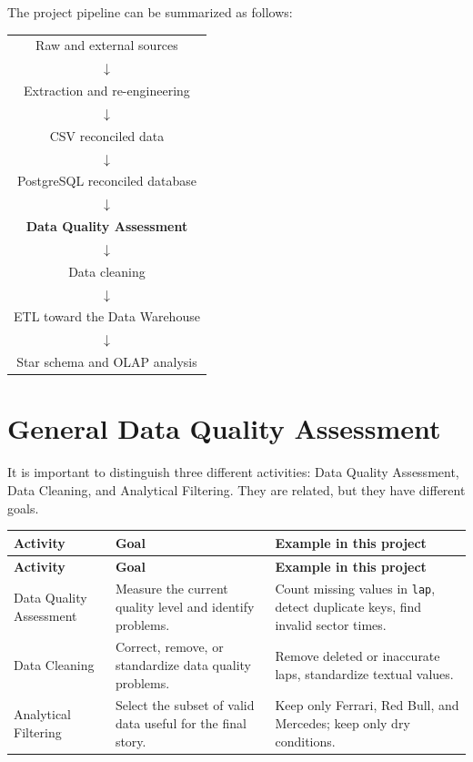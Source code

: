 \documentclass[a4paper,11pt]{article}
\begin{document}
	The project pipeline can be summarized as follows:
	
	\begin{center}
		\begin{tabular}{c}
			Raw and external sources \\
			$\downarrow$ \\
			Extraction and re-engineering \\
			$\downarrow$ \\
			CSV reconciled data \\
			$\downarrow$ \\
			PostgreSQL reconciled database \\
			$\downarrow$ \\
			\textbf{Data Quality Assessment} \\
			$\downarrow$ \\
			Data cleaning \\
			$\downarrow$ \\
			ETL toward the Data Warehouse \\
			$\downarrow$ \\
			Star schema and OLAP analysis
		\end{tabular}
	\end{center}
	

	\section{General Data Quality Assessment}
	
	It is important to distinguish three different activities: Data Quality Assessment, Data Cleaning, and Analytical Filtering.
	They are related, but they have different goals.
	
	\begin{longtable}{p{3.5cm}p{5.5cm}p{6cm}}
		\toprule
		\textbf{Activity} & \textbf{Goal} & \textbf{Example in this project} \\
		\midrule
		\endfirsthead
		\toprule
		\textbf{Activity} & \textbf{Goal} & \textbf{Example in this project} \\
		\midrule
		\endhead
		Data Quality Assessment & Measure the current quality level and identify problems. & Count missing values in \texttt{lap}, detect duplicate keys, find invalid sector times. \\
		\midrule
		Data Cleaning & Correct, remove, or standardize data quality problems. & Remove deleted or inaccurate laps, standardize textual values. \\
		\midrule
		Analytical Filtering & Select the subset of valid data useful for the final story. & Keep only Ferrari, Red Bull, and Mercedes; keep only dry conditions. \\
		\bottomrule
	\end{longtable}
	
\end{document}
